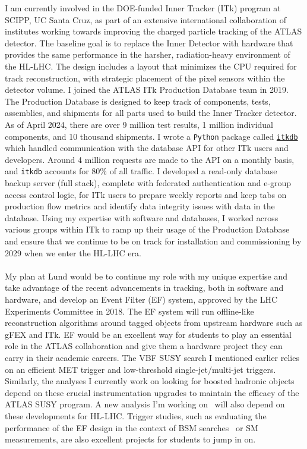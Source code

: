 I am currently involved in the DOE-funded Inner Tracker (ITk) program at SCIPP, UC Santa Cruz, as part of an extensive international collaboration of institutes working towards improving the charged particle tracking of the ATLAS detector. The baseline goal is to replace the Inner Detector with hardware that provides the same performance in the harsher, radiation-heavy environment of the HL-LHC. The design includes a layout that minimizes the CPU required for track reconstruction, with strategic placement of the pixel sensors within the detector volume. I joined the ATLAS ITk Production Database team in 2019. The Production Database is designed to keep track of components, tests, assemblies, and shipments for all parts used to build the Inner Tracker detector. As of April 2024, there are over 9 million test results, 1 million individual components, and 10 thousand shipments. I wrote a \texttt{Python} package called \href{https://itkdb.docs.cern.ch/latest/}{\texttt{itkdb}} which handled communication with the database API for other ITk users and developers. Around 4 million requests are made to the API on a monthly basis, and \texttt{itkdb} accounts for 80\% of all traffic. I developed a read-only database backup server (full stack), complete with federated authentication and e-group access control logic, for ITk users to prepare weekly reports and keep tabs on production flow metrics and identify data integrity issues with data in the database. Using my expertise with software and databases, I worked across various groups within ITk to ramp up their usage of the Production Database and ensure that we continue to be on track for installation and commissioning by 2029 when we enter the HL-LHC era.
\\
\\
My plan at Lund would be to continue my role with my unique expertise and take advantage of the recent advancements in tracking, both in software and hardware, and develop an Event Filter (EF) system, approved by the LHC Experiments Committee in 2018. The EF system will run offline-like reconstruction algorithms around tagged objects from upstream hardware such as gFEX and ITk. EF would be an excellent way for students to play an essential role in the ATLAS collaboration and give them a hardware project they can carry in their academic careers. The VBF SUSY search I mentioned earlier relies on an efficient MET trigger and low-threshold single-jet/multi-jet triggers. Similarly, the analyses I currently work on looking for boosted hadronic objects depend on these crucial instrumentation upgrades to maintain the efficacy of the ATLAS SUSY program. A new analysis I'm working on~ will also depend on these developments for HL-LHC. Trigger studies, such as evaluating the performance of the EF design in the context of BSM searches~ %
or SM measurements, are also excellent projects for students to jump in on.

